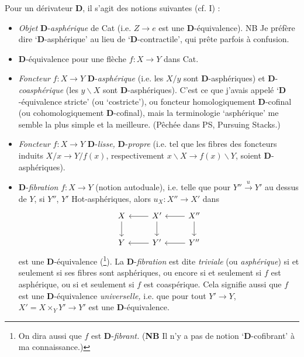 \documentclass[11pt]{article}
\newcommand{\msp}[1]{\marginpar{\footnotesize [#1]}}
\newcommand{\D}{\mathbf{D}}
\begin{document}
Pour un dérivateur $\D$, il s’agit des notions suivantes (cf. I) :

\begin{itemize}
\item[(i)] \textit{Objet} $\D$-\textit{asphérique} de Cat (i.e. $Z \longrightarrow e$ est une $\D$-équivalence). NB Je préfère dire ‘$\D$-asphérique’ au lieu de ‘$\D$-contractile’, qui prête parfois à confusion.

\item[\textcircled{ii}] $\D$-équivalence pour une flèche $f : X \longrightarrow Y$ dans Cat.

\item[(iii)] \textit{Foncteur} $f : X \longrightarrow Y$ $\D$-\textit{asphérique} (i.e. les $X/y$ sont $\D$-asphériques) et $\D$-\textit{coasphérique} (les $y\backslash X$ sont $\D$-asphériques). C’est ce que j’avais appelé ‘$\D$-équivalence stricte’ (ou ‘costricte’), ou foncteur homologiquement $\D$-cofinal (ou cohomologiquement $\D$-cofinal), mais la terminologie ‘asphérique’ me semble la plus simple et la meilleure. (Pêchée dans PS, Pursuing Stacks.)

\item[(iv)] \textit{Foncteur} $f : X \longrightarrow Y$ $\D$-\textit{lisse,} $\D$-\textit{propre} (i.e. tel que les fibres des foncteurs induits $X/x \longrightarrow Y/f(x)$, respectivement $x\backslash X \longrightarrow f(x)\backslash Y$, soient $\D$-asphériques).

\item[(v)] $\D$-\textit{fibration} $f : X \longrightarrow Y$ (notion autoduale), i.e. telle que pour $Y'' \xrightarrow{u} Y'$ au dessus de $Y$, si $Y''$, $Y'$ Hot-asphériques, alors $u_X : X'' \longrightarrow X'$ dans
\[
\begin{tikzcd}
X \arrow[d] & X' \arrow[l] \arrow[d] & X'' \arrow[l] \arrow[d] \\
Y & Y' \arrow[l] & Y'' \arrow[l]
\end{tikzcd}
\]
est une $\D$-équivalence (\footnote{On dira aussi que $f$ est $\D$-\textit{fibrant.} (\textbf{NB} Il n’y a pas de notion ‘$\D$-cofibrant’ à ma connaissance.)}). La $\D$-\textit{fibration} est dite \textit{triviale} (ou \textit{asphérique}) si et seulement si ses fibres sont asphériques, ou encore si et seulement si $f$ est asphérique, ou si et seulement si $f$ est coaspérique. Cela signifie aussi que $f$ est une $\D$-équivalence \textit{universelle,} %
\msp{page 2}
i.e. que pour tout $Y' \longrightarrow Y$, $X' = X \times_Y Y' \longrightarrow Y'$ est une $\D$-équivalence.


\end{itemize}
\end{document}
